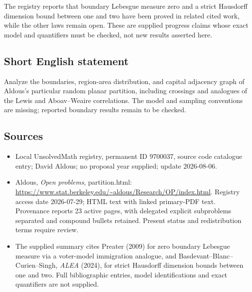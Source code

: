 \documentclass[11pt]{article}
\begin{document}
The registry reports that boundary Lebesgue measure zero and a strict Hausdorff dimension bound between one and two have been proved in related cited work, while the other laws remain open. These are supplied progress claims whose exact model and quantifiers must be checked, not new results asserted here.
\subsection{Short English statement}
Analyze the boundaries, region-area distribution, and capital adjacency graph of Aldous's particular random planar partition, including crossings and analogues of the Lewis and Aboav--Weaire correlations. The model and sampling conventions are missing; reported boundary results remain to be checked.
\subsection{Sources}
\begin{itemize}
\item Local UnsolvedMath registry, permanent ID 9700037, source code catalogue entry; David Aldous; no proposal year supplied; update 2026-08-06.
\item Aldous, \emph{Open problems}, partition.html: \url{https://www.stat.berkeley.edu/~aldous/Research/OP/index.html}. Registry access date 2026-07-29; HTML text with linked primary-PDF text. Provenance reports 23 active pages, with delegated explicit subproblems separated and compound bullets retained. Present status and redistribution terms require review.
\item The supplied summary cites Preater (2009) for zero boundary Lebesgue measure via a voter-model immigration analogue, and Basdevant--Blanc--Curien--Singh, \emph{ALEA} (2024), for strict Hausdorff dimension bounds between one and two. Full bibliographic entries, model identifications and exact quantifiers are not supplied.
\end{itemize}
\end{document}
